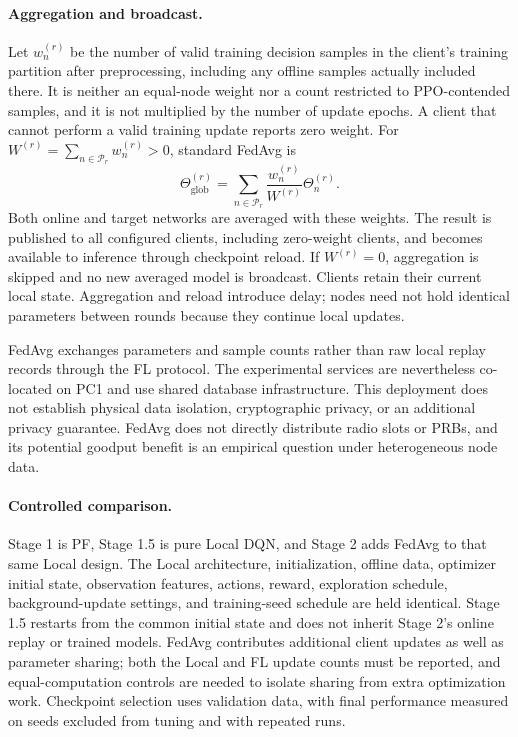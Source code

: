 \begin{EnChapter}
\paragraph{Aggregation and broadcast.}
Let $w_n^{(r)}$ be the number of valid training decision samples in the client's
training partition after preprocessing, including any offline samples actually
included there. It is neither an equal-node weight nor a count restricted to
PPO-contended samples, and it is not multiplied by the number of update epochs.
A client that cannot perform a valid training update reports zero weight.
For $W^{(r)}=\sum_{n\in\mathcal{P}_r}w_n^{(r)}>0$, standard FedAvg is
\begin{equation}
  \Theta_{\mathrm{glob}}^{(r)}=
        \sum_{n\in\mathcal{P}_r}\frac{w_n^{(r)}}{W^{(r)}}\Theta_n^{(r)}.
  \label{eq:fedavg}
\end{equation}
Both online and target networks are averaged with these weights. The result is
published to all configured clients, including zero-weight clients, and becomes
available to inference through checkpoint reload. If $W^{(r)}=0$, aggregation is
skipped and no new averaged model is broadcast. Clients retain their current
local state. Aggregation and reload introduce delay; nodes need not hold
identical parameters between rounds because they continue local updates.

FedAvg exchanges parameters and sample counts rather than raw local replay
records through the FL protocol. The experimental services are nevertheless
co-located on PC1 and use shared database infrastructure. This deployment does
not establish physical data isolation, cryptographic privacy, or an additional
privacy guarantee. FedAvg does not directly distribute radio slots or PRBs,
and its potential goodput benefit is an empirical question under heterogeneous
node data.

\paragraph{Controlled comparison.}
Stage 1 is PF, Stage 1.5 is pure Local DQN, and Stage 2 adds FedAvg to that same
Local design. The Local architecture, initialization, offline data, optimizer
initial state, observation features, actions, reward, exploration schedule,
background-update settings, and training-seed schedule are held identical.
Stage 1.5 restarts from the common initial state and does not inherit Stage 2's
online replay or trained models. FedAvg contributes additional client updates
as well as parameter sharing; both the Local and FL update counts must be
reported, and equal-computation controls are needed to isolate sharing from
extra optimization work. Checkpoint selection uses validation data, with final
performance measured on seeds excluded from tuning and with repeated runs.


\end{EnChapter}
